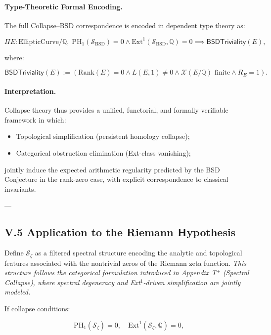 \documentclass[11pt]{article}
\newcommand{\Sha}{\mathcal{X}}
\begin{document}
\paragraph{Type-Theoretic Formal Encoding.}

The full Collapse--BSD correspondence is encoded in dependent type theory as:

\[
\Pi E : \mathrm{EllipticCurve}/\mathbb{Q},\;
\mathrm{PH}_1(\mathcal{S}_{\mathrm{BSD}}) = 0 \wedge \mathrm{Ext}^1(\mathcal{S}_{\mathrm{BSD}}, \mathbb{Q}) = 0
\implies
\mathsf{BSDTriviality}(E),
\]

where:

\[
\mathsf{BSDTriviality}(E) := \left( \mathrm{Rank}(E) = 0 \wedge L(E, 1) \neq 0 \wedge \Sha(E/\mathbb{Q}) \text{ finite} \wedge R_E = 1 \right).
\]

\paragraph{Interpretation.}

Collapse theory thus provides a unified, functorial, and formally verifiable framework in which:

\begin{itemize}
    \item Topological simplification (persistent homology collapse);
    \item Categorical obstruction elimination (Ext-class vanishing);
\end{itemize}

jointly induce the expected arithmetic regularity predicted by the BSD Conjecture in the rank-zero case, with explicit correspondence to classical invariants.

---

\subsection*{V.5 Application to the Riemann Hypothesis}

Define $\mathcal{S}_{\zeta}$ as a filtered spectral structure encoding the analytic and topological features associated with the nontrivial zeros of the Riemann zeta function.  
\textit{This structure follows the categorical formulation introduced in Appendix T$^{+}$ (Spectral Collapse), where spectral degeneracy and Ext$^1$-driven simplification are jointly modeled.}

If collapse conditions:

\[
\mathrm{PH}_1(\mathcal{S}_{\zeta}) = 0, \quad \mathrm{Ext}^1(\mathcal{S}_{\zeta}, \mathbb{Q}) = 0,
\]
\end{document}
